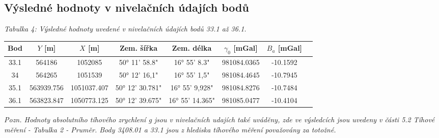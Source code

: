 \subsection{Výsledné hodnoty v nivelačních údajích bodů}

\begin{table}[H]
  \centering
  \textit{Tabulka 4: Výsledné hodnoty uvedené v nivelačních údajích bodů 33.1 až 36.1.}
  \begin{tabular}{|c|c|c|c|c|c|c|c|}
    \hline
    \textbf{Bod} & \textbf{\(Y\) [m]} & \textbf{\(X\) [m]} & \textbf{Zem. šířka} & \textbf{Zem. délka} & \textbf{\(\gamma_0\) [mGal]} & \textbf{\(B_a\) [mGal]} \\
    \hline\hline
    33.1 & 564186 & 1052085 & 50° 11' 58.8" & 16° 55' 8.3" & 981084.0365 & -10.1592 \\
    34   & 564265 & 1051539 & 50° 12' 16,1" & 16° 55' 1,5" & 981084.4645 & -10.7945 \\
    35.1 & 563939.756 & 1051037.407 & 50° 12' 30.781" & 16° 55' 9,928" & 981084.8276 & -10.7484 \\
    36.1 & 563823.847 & 1050773.125 & 50° 12' 39.675" & 16° 55' 14.365" & 981085.0477 & -10.4104 \\
    \hline
  \end{tabular}
  \label{tab:niv_udaje}
\end{table}

\textit{Pozn. Hodnoty absolutního tíhového zrychlení g jsou v nivelačních udajích také uváděny, zde ve výsledcích jsou uvedeny v části 5.2 Tíhové měření - Tabulka 2 - Pruměr. Body 3408.01 a 33.1 jsou z hlediska tíhového měření považovány za totožné.}